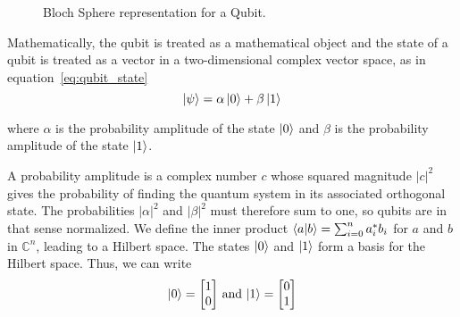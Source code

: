 \begin{figure}[H]
  \centering
{}
\caption{Bloch Sphere representation for a Qubit.}
\label{fig:blochSphere}
\end{figure}



Mathematically, the qubit is treated as a mathematical object and the state of a qubit is treated as a vector in a two-dimensional complex vector space, as in equation~\ref{eq:qubit_state}
\begin{equation}
\ket{\psi} = \alpha \ket{0} + \beta \ket{1}
\label{eq:qubit_state}
\end{equation}

where $\alpha$ is the probability amplitude of the state $\ket{0}$ and $\beta$ is the probability amplitude of the state $\ket{1}$.

A probability amplitude is a complex number $c$ whose squared magnitude $\vert c \vert^2$ gives the probability of finding the quantum system in its associated orthogonal state.
The probabilities $|\alpha|^2$ and $|\beta|^2$ must therefore sum to one, so qubits are in that sense normalized.
We define the inner product $\braket{a | b} = \sum_{i=0}^{n} a_i^* b_i$ for $a$ and $b$ in $\mathbb{C}^n$, leading to a Hilbert space.
The states $\ket{0}$ and $\ket{1}$ form a basis for the Hilbert space.
Thus, we can write
$$\ket{0} = \begin{bmatrix} 1 \\ 0 \end{bmatrix} \, \textrm{and} \, \ket{1} = \begin{bmatrix} 0 \\ 1 \end{bmatrix}$$



